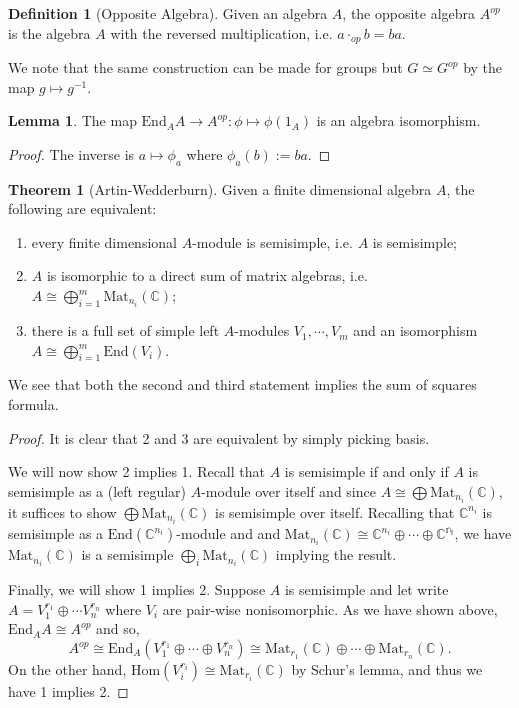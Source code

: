 \documentclass[]{article}
\theoremstyle{definition}
\newtheorem{theorem}{Theorem}
\theoremstyle{definition}
\newtheorem{definition}{Definition}[section]
\newtheorem{lemma}{Lemma}[section]
\begin{document}
\begin{definition}[Opposite Algebra]
  Given an algebra \(A\), the opposite algebra \(A^{op}\) is the algebra 
  \(A\) with the reversed multiplication, i.e. \(a \cdot_{op} b = ba\).
\end{definition}

We note that the same construction can be made for groups but \(G \simeq G^{op}\) 
by the map \(g \mapsto g^{-1}\).

\begin{lemma}
  The map \(\text{End}_A A \to A^{op} : \phi \mapsto \phi(1_A)\) is an algebra 
  isomorphism.
\end{lemma}
\begin{proof}
  The inverse is \(a \mapsto \phi_a\) where \(\phi_a(b) := ba\).
\end{proof}

\begin{theorem}[Artin-Wedderburn]
  Given a finite dimensional algebra \(A\), the following are equivalent:
  \begin{enumerate}
    \item every finite dimensional \(A\)-module is semisimple, i.e. 
      \(A\) is semisimple;
    \item \(A\) is isomorphic to a direct sum of matrix algebras, i.e.
      \(A \cong \bigoplus_{i = 1}^m \text{Mat}_{n_i}(\mathbb{C})\);
    \item there is a full set of simple left \(A\)-modules \(V_1, \cdots, V_m\) 
      and an isomorphism \(A \cong \bigoplus_{i = 1}^m \text{End}(V_i)\).
  \end{enumerate}
\end{theorem}

We see that both the second and third statement implies the sum of squares formula.

\begin{proof}
  It is clear that 2 and 3 are equivalent by simply picking basis. 
  
  We will now show 2 implies 1. 
  Recall that \(A\) is semisimple if and only if \(A\) is semisimple as a 
  (left regular) \(A\)-module over itself and since 
  \(A \cong \bigoplus \text{Mat}_{n_i}(\mathbb{C})\), it suffices to show 
  \(\bigoplus \text{Mat}_{n_i}(\mathbb{C})\) is semisimple over itself. 
  Recalling that \(\mathbb{C}^{n_i}\) is semisimple 
  as a \( \text{End}(\mathbb{C}^{n_i})\)-module and
  and \(\text{Mat}_{n_i}(\mathbb{C}) \cong \mathbb{C}^{n_i} \oplus \cdots \oplus 
  \mathbb{C^{n_i}}\), we have \(\text{Mat}_{n_i}(\mathbb{C})\) is a semisimple 
  \(\bigoplus_i \text{Mat}_{n_i}(\mathbb{C})\) implying the result.

  Finally, we will show 1 implies 2. Suppose \(A\) is semisimple and let 
  write \(A = V_1^{r_1} \oplus \cdots V_n^{r_n}\) where \(V_i\) are 
  pair-wise nonisomorphic. As we have shown above, \(\text{End}_A A \cong A^{op}\)
  and so, 
  \[A^{op} \cong \text{End}_A(V_1^{r_1} \oplus \cdots \oplus V_n^{r_n})
   \cong \text{Mat}_{r_1}(\mathbb{C}) \oplus \cdots \oplus 
   \text{Mat}_{r_n}(\mathbb{C}).\]
  On the other hand, \(\text{Hom}(V_i^{r_i}) \cong \text{Mat}_{r_i}(\mathbb{C})\) 
  by Schur's lemma, and thus we have 1 implies 2. 
\end{proof}
\end{document}

